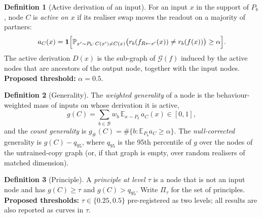 \documentclass[11pt]{article}
\theoremstyle{definition}
\newtheorem{definition}{Definition}[section]
\theoremstyle{plain}
\theoremstyle{remark}
\newcommand{\B}{\mathcal{B}}
\newcommand{\E}{\mathbb{E}}
\renewcommand{\Pr}{\mathbb{P}}
\newcommand{\G}{\mathcal{G}}
\begin{document}
\begin{definition}[Active derivation of an input]\label{def:active}
For an input $x$ in the support of $P_b$, node $C$ is \emph{active on $x$}
if its realiser swap moves the readout on a majority of partners:
\[
a_C(x)=\mathbf{1}\Bigl[\Pr_{x'\sim P_b:\,C(x')\neq C(x)}
\bigl(r_b(f_{R\leftarrow x'}(x))\neq r_b(f(x))\bigr)\ge\alpha\Bigr].
\]
The active derivation $D(x)$ is the sub-graph of $\G(f)$ induced by the
active nodes that are ancestors of the output node, together with the input
nodes. \textbf{Proposed threshold:} $\alpha=0.5$.
\end{definition}

\begin{definition}[Generality]\label{def:generality}
The \emph{weighted generality} of a node is the behaviour-weighted mass of
inputs on whose derivation it is active,
\[
g(C)=\sum_{b\in\B}w_b\,\E_{x\sim P_b}\,a_C(x)\in[0,1],
\]
and the \emph{count generality} is
$g_\#(C)=\#\{b:\E_{P_b}a_C\ge\alpha\}$. The \emph{null-corrected}
generality is $g(C)-q_{95}$, where $q_{95}$ is the 95th percentile of $g$ over
the nodes of the untrained-copy graph (or, if that graph is empty, over random
realisers of matched dimension).
\end{definition}

\begin{definition}[Principle]\label{def:principle}
A \emph{principle at level $\tau$} is a node that is not an input node and has
$g(C)\ge\tau$ and $g(C)>q_{95}$. Write $\Pi_\tau$ for the set of principles.
\textbf{Proposed thresholds:} $\tau\in\{0.25,0.5\}$ pre-registered as two
levels; all results are also reported as curves in $\tau$.
\end{definition}
\end{document}
